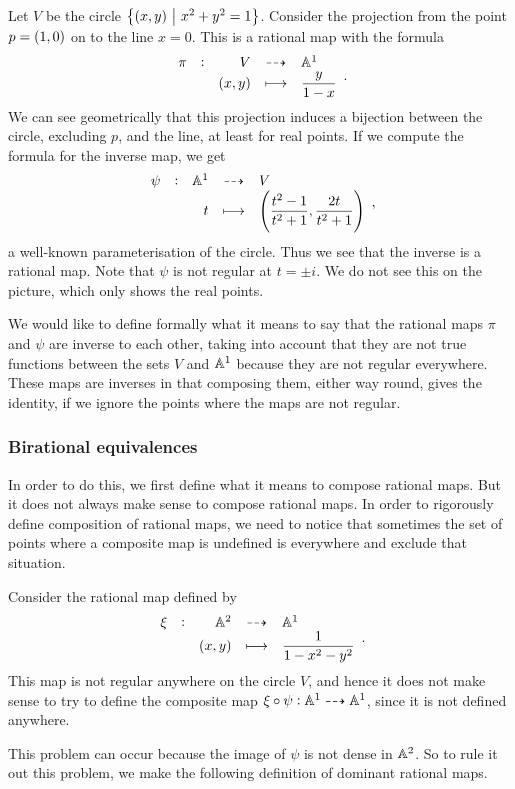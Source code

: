 \begin{example*}
Let $ V $ be the circle $ \cbr{\br{x, y} \st x^2 + y^2 = 1} $. Consider the projection from the point $ p = \br{1, 0} $ on to the line $ x = 0 $. This is a rational map with the formula
$$ \rational[\pi]{V}{\AA^1}{\br{x, y}}{\dfrac{y}{1 - x}}. $$
We can see geometrically that this projection induces a bijection between the circle, excluding $ p $, and the line, at least for real points. If we compute the formula for the inverse map, we get
$$ \rational[\psi]{\AA^1}{V}{t}{\br{\dfrac{t^2 - 1}{t^2 + 1}, \dfrac{2t}{t^2 + 1}}}, $$
a well-known parameterisation of the circle. Thus we see that the inverse is a rational map. Note that $ \psi $ is not regular at $ t = \pm i $. We do not see this on the picture, which only shows the real points.
\end{example*}

We would like to define formally what it means to say that the rational maps $ \pi $ and $ \psi $ are inverse to each other, taking into account that they are not true functions between the sets $ V $ and $ \AA^1 $ because they are not regular everywhere. These maps are inverses in that composing them, either way round, gives the identity, if we ignore the points where the maps are not regular.

\subsubsection{Birational equivalences}


In order to do this, we first define what it means to compose rational maps. But it does not always make sense to compose rational maps. In order to rigorously define composition of rational maps, we need to notice that sometimes the set of points where a composite map is undefined is everywhere and exclude that situation.

\begin{example*}
Consider the rational map defined by
$$ \rational[\xi]{\AA^2}{\AA^1}{\br{x, y}}{\dfrac{1}{1 - x^2 - y^2}}. $$
This map is not regular anywhere on the circle $ V $, and hence it does not make sense to try to define the composite map $ \xi \circ \psi : \AA^1 \dashrightarrow \AA^1 $, since it is not defined anywhere.
\end{example*}

This problem can occur because the image of $ \psi $ is not dense in $ \AA^2 $. So to rule it out this problem, we make the following definition of dominant rational maps.

